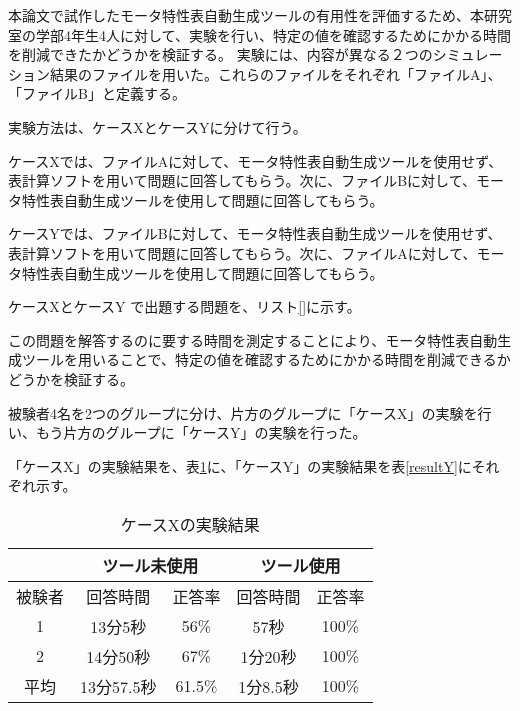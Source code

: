 本論文で試作したモータ特性表自動生成ツールの有用性を評価するため、本研究室の学部4年生4人に対して、実験を行い、特定の値を確認するためにかかる時間を削減できたかどうかを検証する。
実験には、内容が異なる２つのシミュレーション結果のファイルを用いた。これらのファイルをそれぞれ「ファイルA」、「ファイルB」と定義する。

実験方法は、ケースXとケースYに分けて行う。

ケースXでは、ファイルAに対して、モータ特性表自動生成ツールを使用せず、表計算ソフトを用いて問題に回答してもらう。次に、ファイルBに対して、モータ特性表自動生成ツールを使用して問題に回答してもらう。

ケースYでは、ファイルBに対して、モータ特性表自動生成ツールを使用せず、表計算ソフトを用いて問題に回答してもらう。次に、ファイルAに対して、モータ特性表自動生成ツールを使用して問題に回答してもらう。

ケースXとケースY で出題する問題を、リスト\ref{}に示す。

この問題を解答するのに要する時間を測定することにより、モータ特性表自動生成ツールを用いることで、特定の値を確認するためにかかる時間を削減できるかどうかを検証する。

被験者4名を2つのグループに分け、片方のグループに「ケースX」の実験を行い、もう片方のグループに「ケースY」の実験を行った。

「ケースX」の実験結果を、表\ref{resultX}に、「ケースY」の実験結果を表\ref{resultY}にそれぞれ示す。


\begin{table}[tp]
  \begin{center}
    \caption{ケースXの実験結果}
    \label{resultX}
    \begin{tabular}{c|c|c|c|c|}
    \cline{2-5}
                              & \multicolumn{2}{c|}{ツール未使用} & \multicolumn{2}{c|}{ツール使用} \\ \hline
    \multicolumn{1}{|c||}{被験者} & 回答時間           & 正答率          & 回答時間           & 正答率         \\ \hline\hline
    \multicolumn{1}{|c||}{1}   & 13分5秒           & 56\%         & 57秒           & 100\%         \\ \hline
    \multicolumn{1}{|c||}{2}   & 14分50秒          & 67\%          & 1分20秒          & 100\%         \\ \hline\hline
    \multicolumn{1}{|c||}{平均}   & 13分57.5秒          & 61.5\%          & 1分8.5秒          & 100\%         \\ \hline
    \end{tabular}
  \end{center}
\end{table}

